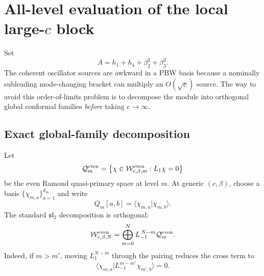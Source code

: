 \documentclass[11pt]{article}
\begin{document}
\section{All-level evaluation of the local large-\(c\) block}

Set
\begin{equation}
 A=h_1+h_4+\beta_2^2+\beta_3^2.
 \label{eq:A}
\end{equation}
The coherent oscillator sources are awkward in a PBW basis because a
nominally subleading mode-changing bracket can multiply an
\(O(\sqrt c)\) source.  The way to avoid this order-of-limits problem is
to decompose the module into orthogonal global conformal families
\emph{before} taking \(c\to\infty\).

\subsection{Exact global-family decomposition}

Let
\begin{equation}
 \mathcal Q_m^{\rm even}
 =
 \left\{\chi\in\mathcal W_{c,\beta,m}^{\rm even}:L_1\chi=0\right\}
 \label{eq:ramond-quasiprimary-space}
\end{equation}
be the even Ramond quasi-primary space at level \(m\).  At generic
\((c,\beta)\), choose a basis
\(\{\chi_{m,a}\}_{a=1}^{d_m}\) and write
\begin{equation}
 Q_m[a,b]=\langle\chi_{m,a}|\chi_{m,b}\rangle .
 \label{eq:quasiprimary-gram}
\end{equation}
The standard \(\mathfrak{sl}_2\) decomposition is orthogonal:
\begin{equation}
 \mathcal W_{c,\beta,N}^{\rm even}
 =
 \bigoplus_{m=0}^{N}
 L_{-1}^{\,N-m}\mathcal Q_m^{\rm even}.
 \label{eq:sl2-family-decomposition}
\end{equation}
Indeed, if \(m>m'\), moving \(L_1^{N-m}\) through the pairing reduces
the cross term to
\begin{equation}
 \langle\chi_{m,a}|L_{-1}^{m-m'}\chi_{m',b}\rangle=0.
 \label{eq:global-family-cross-term}
\end{equation}
\end{document}
